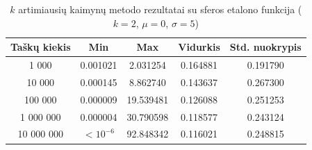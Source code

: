 \begin{table}[H]
    \centering
    \begin{tabular}{|c|c|c|c|c|}
        \hline
        \textbf{Taškų kiekis} & \textbf{Min} & \textbf{Max} & \textbf{Vidurkis} & \textbf{Std. nuokrypis} \\ \hline
        1 000        & 0.001021 & 2.031254 & 0.164881 & 0.191790 \\ \hline
        10 000       & 0.000145 & 8.862740 & 0.143637 & 0.267300 \\ \hline
        100 000      & 0.000009 & 19.539481 & 0.126088 & 0.251253 \\ \hline
        1 000 000    & 0.000004 & 30.790598 & 0.118577 & 0.243124 \\ \hline
        10 000 000   & $<10^{-6}$ & 92.848342 & 0.116021 & 0.248815 \\ \hline
    \end{tabular}
    \caption{$k$ artimiausių kaimynų metodo rezultatai su sferos etalono funkcija ($k = 2$, $\mu = 0$, $\sigma = 5$)}
\end{table}